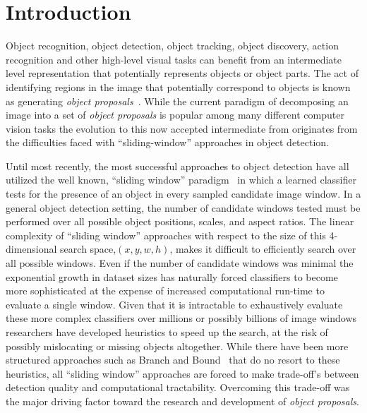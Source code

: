 \section{Introduction}
\label{sec:intro}

Object recognition, object detection, object tracking, object discovery, action recognition and other high-level visual tasks can benefit from an intermediate level representation that potentially represents objects or object parts. The act of identifying regions in the image that potentially correspond to objects is known as generating \emph{object proposals}~\cite{Malisiewicz:Efros:BMVC07, Alexe:etal:PAMI12, Endres:Hoiem:PAMI14, Carreira:Sminchisescu:PAMI12, Chang:etal:ICCV11, Rahtu:etal:ICCV11,Zhang:Torr:PAMI16, Feng:etal:ICCV11, Uijlings:etal:IJCV13, Narayanan:Kimia:ECCV12, Kim:Grauman:ECCV12, Manen:etal:ICCV13, Humayun:etal:CVPR14, Arbelaez:etal:CVPR14, Rantalankila:etal:CVPR14, Krahenbuhl:Koltun:ECCV14, Bonev:Yuille:ECCV14, Zitnick:Dollar:ECCV14, Cheng:etal:CVPR14, Erhan:etal:CVPR14, Krahenbuhl:Koltun:CVPR15, Xiao:Lu:etal:CVPR15, Chen:etal:CVPR15, Lu:etal:ICCV15, Humayun:etal:ICCV15, He:Lau:ICCV15}. While the current paradigm of decomposing an image into a set of \emph{object proposals} is popular among many different computer vision tasks the evolution to this now accepted intermediate from originates from the difficulties faced with ``sliding-window'' approaches in object detection.

Until most recently, the most successful approaches to object detection have all utilized the well known, ``sliding window'' paradigm~\cite{Papageorgiou:Poggio:IJCV00,Viola:Jones:IJCV04,Felzenszwalb:PAMI:09} in which a learned classifier tests for the presence of an object in every sampled candidate image window. In a general object detection setting, the number of candidate windows tested must be performed over all possible object positions, scales, and aspect ratios. The linear complexity of ``sliding window'' approaches with respect to the size of this 4-dimensional search space,$(x,y,w,h)$, makes it difficult to efficiently search over all possible windows. Even if the number of candidate windows was minimal the exponential growth in dataset sizes has naturally forced classifiers to become more sophisticated at the expense of increased computational run-time to evaluate a single window. Given that it is intractable to exhaustively evaluate these more complex classifiers over millions or possibly billions of image windows researchers have developed heuristics to speed up the search, at the risk of possibly mislocating or missing objects altogether. While there have been more structured approaches such as Branch and Bound~\cite{Lampert:etal:PAMI09} that do no resort to these heuristics, all ``sliding window'' approaches are forced to make trade-off's between  detection quality and computational tractability.  Overcoming this trade-off was the major driving factor toward the research and development of \emph{object proposals}. 

